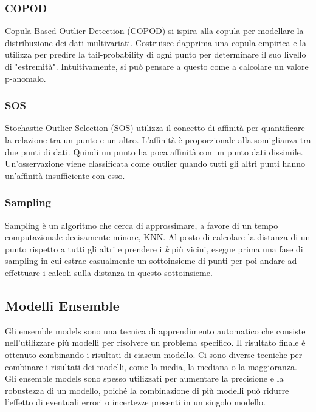 \subsubsection{COPOD}
Copula Based Outlier Detection (COPOD) \cite{li2020copod} si ispira alla copula per modellare la distribuzione dei dati multivariati. Costruisce dapprima una copula empirica e la utilizza per predire la tail-probability di ogni punto per determinare il suo
livello di "estremità". Intuitivamente, si può pensare a questo come a calcolare
un valore p-anomalo.

\subsubsection{SOS}
Stochastic Outlier Selection (SOS) \cite{janssens2012stochastic} utilizza il concetto di affinità per quantificare la relazione tra un punto e un altro. L'affinità è proporzionale alla somiglianza tra due punti di dati. Quindi un punto ha poca affinità con un punto dati dissimile. 
Un'osservazione viene classificata come outlier quando tutti gli altri punti hanno un'affinità insufficiente con esso.

\subsubsection{Sampling}
Sampling \cite{sugiyama2013rapid} è un algoritmo che cerca di approssimare, a favore di un tempo computazionale decisamente minore, KNN. Al posto di calcolare la distanza di un punto rispetto a tutti gli altri e prendere i \textit{k} più vicini, esegue prima una fase di sampling in cui estrae casualmente un sottoinsieme di punti per poi andare ad effettuare i calcoli sulla distanza in questo sottoinsieme.

\subsection{Modelli Ensemble}
Gli ensemble models sono una tecnica di apprendimento automatico che consiste nell'utilizzare più modelli per risolvere un problema specifico. Il risultato finale è ottenuto combinando i risultati di ciascun modello. Ci sono diverse tecniche per combinare i risultati dei modelli, come la media, la mediana o la maggioranza. Gli ensemble models sono spesso utilizzati per aumentare la precisione e la robustezza di un modello, poiché la combinazione di più modelli può ridurre l'effetto di eventuali errori o incertezze presenti in un singolo modello.

